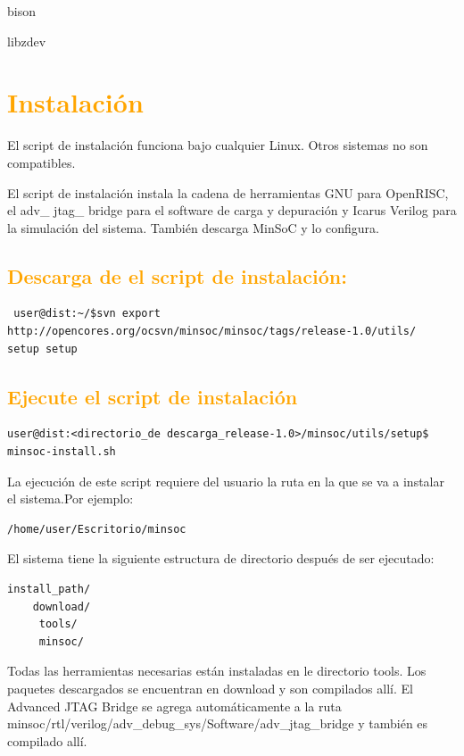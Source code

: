 bison

libz\-dev 


 
\section{\textcolor{orange}{Instalación }}

El script de instalación funciona bajo cualquier Linux. Otros sistemas no son compatibles.

El script de instalación instala la cadena de herramientas GNU para OpenRISC, el adv\_ jtag\_ bridge para el software de carga y depuración y Icarus Verilog para la simulación del sistema. También descarga MinSoC y lo configura.
 

\subsection{\textcolor{orange}{Descarga de el script de instalación:}}

\begin{verbatim}
 user@dist:~/$svn export http://opencores.org/ocsvn/minsoc/minsoc/tags/release-1.0/utils/
setup setup
\end{verbatim}

\subsection{\textcolor{orange}{Ejecute el script de instalación}}

\begin{verbatim}
user@dist:<directorio_de descarga_release-1.0>/minsoc/utils/setup$ minsoc-install.sh
\end{verbatim}

La ejecución de este script requiere del usuario la ruta en la que se va a instalar el sistema.Por ejemplo:

\begin{verbatim}
/home/user/Escritorio/minsoc
\end{verbatim}

El sistema tiene la siguiente estructura de directorio después de ser ejecutado: 
\begin{verbatim}
install_path/
	download/
	 tools/
 	 minsoc/
\end{verbatim}

Todas las herramientas necesarias están instaladas en le directorio tools. Los paquetes descargados se encuentran en download y son compilados allí. El Advanced JTAG Bridge se agrega automáticamente a la ruta minsoc/rtl/verilog/adv\_debug\_sys/Software/adv\_jtag\_bridge  y también es compilado allí. 

